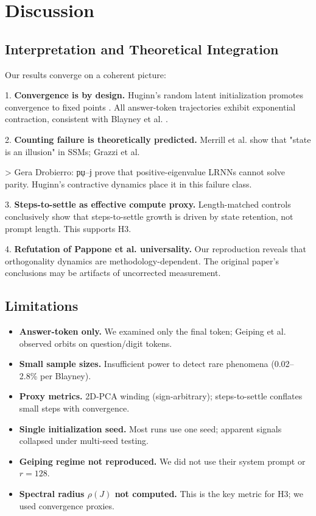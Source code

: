 \section{Discussion}

\subsection{Interpretation and Theoretical Integration}

Our results converge on a coherent picture:

1. \textbf{Convergence is by design.} Huginn's random latent initialization promotes convergence to fixed points \cite{geiping2025scaling}. All answer-token trajectories exhibit exponential contraction, consistent with Blayney et al. \cite{blayney2026mechanistic}.

2. \textbf{Counting failure is theoretically predicted.} Merrill et al. \cite{merrill2024illusion} show that "state is an illusion" in SSMs; Grazzi et al.

> Gera Drobierro:
рџ–ј \cite{grazzi2024unlocking} prove that positive-eigenvalue LRNNs cannot solve parity. Huginn's contractive dynamics place it in this failure class.

3. \textbf{Steps-to-settle as effective compute proxy.} Length-matched controls conclusively show that steps-to-settle growth is driven by state retention, not prompt length. This supports H3.

4. \textbf{Refutation of Pappone et al. universality.} Our reproduction reveals that orthogonality dynamics are methodology-dependent. The original paper's conclusions may be artifacts of uncorrected measurement.

\subsection{Limitations}

\begin{itemize}
    \item \textbf{Answer-token only.} We examined only the final token; Geiping et al. observed orbits on question/digit tokens.
    \item \textbf{Small sample sizes.} Insufficient power to detect rare phenomena (0.02--2.8\% per Blayney).
    \item \textbf{Proxy metrics.} 2D-PCA winding (sign-arbitrary); steps-to-settle conflates small steps with convergence.
    \item \textbf{Single initialization seed.} Most runs use one seed; apparent signals collapsed under multi-seed testing.
    \item \textbf{Geiping regime not reproduced.} We did not use their system prompt or $r=128$.
    \item \textbf{Spectral radius $\rho(J)$ not computed.} This is the key metric for H3; we used convergence proxies.
\end{itemize}

